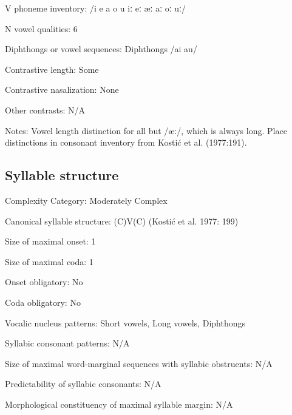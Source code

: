 {\begin{appendixdesc}
\item[V phoneme inventory:] /i e a o u iː eː æː aː oː uː/

\item[N vowel qualities:] 6

\item[Diphthongs or vowel sequences:] Diphthongs /ai au/

\item[Contrastive length:] Some

\item[Contrastive nasalization:] None

\item[Other contrasts:] N/A

\item[Notes:] Vowel length distinction for all but /æː/, which is always long. Place distinctions in consonant inventory from Kostić et al. (1977:191).
\end{appendixdesc}
\subsection*{Syllable structure}
\begin{appendixdesc}

\item[Complexity Category:] Moderately Complex

\item[Canonical syllable structure:] (C)V(C) (Kostić et al. 1977: 199)

\item[Size of maximal onset:] 1

\item[Size of maximal coda:] 1

\item[Onset obligatory:] No

\item[Coda obligatory:] No

\item[Vocalic nucleus patterns:] Short vowels, Long vowels, Diphthongs

\item[Syllabic consonant patterns:] N/A

\item[Size of maximal word-marginal sequences with syllabic obstruents:] N/A

\item[Predictability of syllabic consonants:] N/A

\item[Morphological constituency of maximal syllable margin:] N/A


\end{appendixdesc}}
